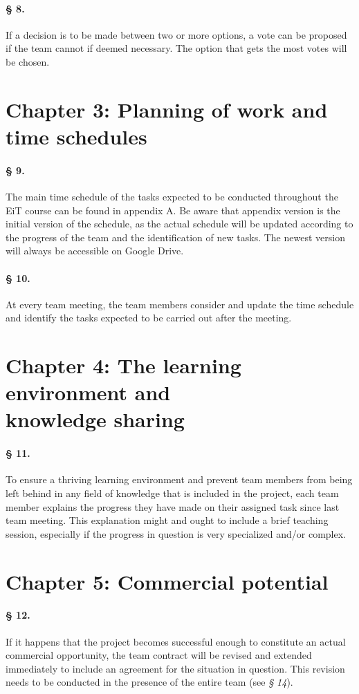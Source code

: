 \paragraph{§ 8.}
If a decision is to be made between two or more options, a vote can be proposed if the team cannot if deemed necessary. The 
option that gets the most votes will be chosen.
\section*{Chapter 3: Planning of work and time schedules}
\paragraph{§ 9.}
The main time schedule of the tasks expected to be conducted throughout the EiT course can be found in appendix A. Be aware that appendix version is the initial version of the schedule, as the actual schedule will be updated according to the progress of the team and the identification of new tasks. The newest version will always be accessible on Google Drive.
\paragraph{§ 10.}
At every team meeting, the team members consider and update the time schedule and identify the tasks expected to be carried out after the meeting.

\section*{Chapter 4: The learning environment and \\ knowledge sharing}
\paragraph{§ 11.}
To ensure a thriving learning environment and prevent team members from being left behind in any field of knowledge that is included in the project, each team member explains the progress they have made on their assigned task since last team meeting. This explanation might and ought to include a brief teaching session, especially if the progress in question is very specialized and/or complex.

\section*{Chapter 5: Commercial potential} \label{Com}
\paragraph{§ 12.}
If it happens that the project becomes successful enough to constitute an actual commercial opportunity, the team contract will be revised and extended immediately to include an agreement for the situation in question. This revision needs to be conducted in the presence of the entire team (see \textit{§ 14}).

